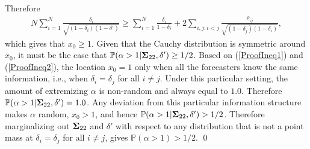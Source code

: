 \documentclass[12pt]{article}
\renewcommand{\P}{\mathbb{P}}
\theoremstyle{definition}
\theoremstyle{definition}
\def\P{{\mathbb P}}
\begin{document}
Therefore 
\begin{align*}
N \sum_{i=1}^N \frac{\delta_i}{\sqrt{(1-\delta_i)(1-\delta')}} \geq \sum_{i=1}^N \frac{\delta_i}{1-\delta_i} + 2 \sum_{i,j: i<j} \frac{\rho_{ij}}{\sqrt{(1-\delta_j)(1-\delta_i)}},
\end{align*}
which gives that $x_0 \geq 1$. Given that the Cauchy distribution is symmetric around $x_0$, it must be the case that $\P(\alpha > 1 | {\bf\Sigma}_{22}, \delta') \geq 1/2$. Based on (\ref{ProofIneq1}) and (\ref{ProofIneq2}), the location $x_0 = 1$ only when all the forecasters know the same information, i.e., when $\delta_i = \delta_j$ for all $i \neq j$. Under this particular setting, the amount of extremizing $\alpha$ is non-random and always equal to $1.0$. Therefore $\P(\alpha > 1 | {\bf\Sigma}_{22}, \delta') = 1.0$.  Any deviation from this particular information structure makes $\alpha$ random, $x_0 > 1$, and hence $\P(\alpha > 1 | {\bf\Sigma}_{22}, \delta') > 1/2$. Therefore marginalizing out ${\bf\Sigma}_{22}$ and $\delta'$ with respect to any distribution that is not a point mass at $\delta_i = \delta_j$ for all $i \neq j$, gives $\P(\alpha > 1) > 1/2$. \qed
\end{document}
